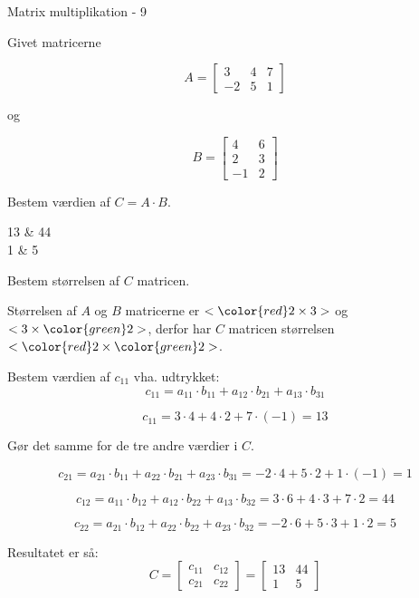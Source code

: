 \documentclass{article}
\begin{document}
\begin{exercise}{Matrix multiplikation - 9}

Givet matricerne

\[
A = \left[\begin{array}{rrr}
3 & 4 & 7 \\
-2 & 5 & 1
\end{array} \right]
\]

og

\[
B = \left[\begin{array}{rr}
4 & 6 \\
2 & 3 \\
-1 & 2
\end{array} \right]
\]

Bestem værdien af $C = A \cdot B$.

\begin{answermatrix}
13 & 44 \\
1 & 5
\end{answermatrix}

\hint
Bestem størrelsen af $C$ matricen.

\hint
Størrelsen af $A$ og $B$ matricerne er $<{\color{red} 2} \times 3>$ og $<3 \times {\color{green}2}>$,
derfor har $C$ matricen størrelsen $<{\color{red} 2} \times {\color{green}2}>$.

\hint
Bestem værdien af $c_{11}$ vha. udtrykket:
\[
c_{11} = a_{11} \cdot b_{11} + a_{12} \cdot b_{21} + a_{13} \cdot b_{31}
\]

\hint
\[
c_{11} = 3 \cdot 4 + 4 \cdot 2 + 7 \cdot (-1) = 13
\]

\hint
Gør det samme for de tre andre værdier i $C$.

\hint
\[
c_{21} = a_{21} \cdot b_{11} + a_{22} \cdot b_{21} + a_{23} \cdot b_{31} = -2 \cdot 4 + 5 \cdot 2 + 1 \cdot (-1) = 1
\]

\hint
\[
c_{12} = a_{11} \cdot b_{12} + a_{12} \cdot b_{22} + a_{13} \cdot b_{32} = 3 \cdot 6 + 4 \cdot 3 + 7 \cdot 2 = 44
\]

\hint
\[
c_{22} = a_{21} \cdot b_{12} + a_{22} \cdot b_{22} + a_{23} \cdot b_{32} = -2 \cdot 6 + 5 \cdot 3 + 1 \cdot 2 = 5
\]


\hint
Resultatet er så:
\[
C = \left[\begin{array}{rr}
c_{11} & c_{12} \\
c_{21} & c_{22}
\end{array} \right] =
\left[\begin{array}{rr}
13 & 44 \\
1 & 5
\end{array} \right]
\]


\end{exercise}
\end{document}
